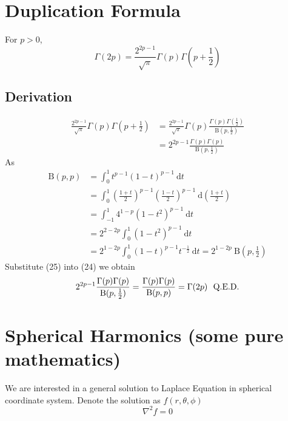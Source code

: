 \documentclass[25pt]{article}
\begin{document}
\section{Duplication Formula}
For $p > 0$,
\begin{equation}
    \Gamma(2p) = \frac{2^{2p-1}}{\sqrt{\pi}} \Gamma(p) \Gamma(p+\frac{1}{2})
\end{equation}
\subsection{Derivation}
\begin{equation}
\begin{aligned}
    \frac{2^{2p-1}}{\sqrt{\pi}} \Gamma(p)\Gamma(p+\frac{1}{2}) &= \frac{2^{2p-1}}{\sqrt{\pi}} \Gamma(p) \frac{\Gamma(p)\Gamma(\frac{1}{2})}{\text{B}(p,\frac{1}{2})}\\
    &= 2^{2p-1} \frac{\Gamma(p)\Gamma(p)}{\text{B}(p,\frac{1}{2})}
\end{aligned}
\end{equation}
As
\begin{equation}
\begin{aligned}
    \text{B}(p, p) &= \int^{1}_{0}t^{p-1}(1-t)^{p-1}~\text{d}t\\
    &= \int^{1}_{0}(\frac{1+t}{2})^{p-1}(\frac{1-t}{2})^{p-1}~\text{d}(\frac{1+t}{2}) \\
    &=\int^{1}_{-1} 4^{1-p}(1-t^2)^{p-1}~\text{d}t\\
    &= 2^{2-2p} \int^{1}_{0} (1-t^2)^{p-1}~\text{d}t \\
    &= 2^{1-2p} \int^{1}_{0} (1-t)^{p-1} t^{-\frac{1}{2}}~\text{d}t = 2^{1-2p}~\text{B}(p,\frac{1}{2}) 
\end{aligned}
\end{equation}
Substitute (25) into (24) we obtain
\begin{equation}
    2^{2p-1} \frac{\Gamma(p)\Gamma(p)}{\text{B}(p,\frac{1}{2})} = \frac{\Gamma(p)\Gamma(p)}{\text{B}(p,p)} = \Gamma(2p)~~\text{Q.E.D.} \notag
\end{equation}
\section{Spherical Harmonics (\small{some pure mathematics})}
We are interested in a general solution to Laplace Equation in spherical coordinate system. Denote the solution as $f(r,\theta,\phi)$
\begin{equation}
    \nabla^2 f = 0
\end{equation}
\end{document}
